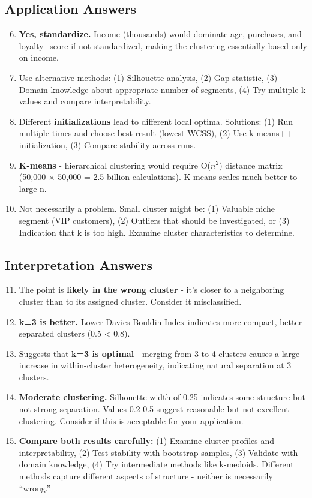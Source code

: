 \documentclass[
]{article}
\begin{document}
\textbf{ }

\subsection{Application Answers}

\begin{enumerate}
\setcounter{enumi}{5}
\item
  \textbf{Yes, standardize.} Income (thousands) would dominate age,
  purchases, and loyalty\_score if not standardized, making the
  clustering essentially based only on income.
\item
  Use alternative methods: (1) Silhouette analysis, (2) Gap statistic,
  (3) Domain knowledge about appropriate number of segments, (4) Try
  multiple k values and compare interpretability.
\item
  Different \textbf{initializations} lead to different local optima.
  Solutions: (1) Run multiple times and choose best result (lowest
  WCSS), (2) Use k-means++ initialization, (3) Compare stability across
  runs.
\item
  \textbf{K-means} - hierarchical clustering would require O(\(n^{2}\))
  distance matrix (50,000 × 50,000 = 2.5 billion calculations). K-means
  scales much better to large n.
\item
  Not necessarily a problem. Small cluster might be: (1) Valuable niche
  segment (VIP customers), (2) Outliers that should be investigated, or
  (3) Indication that k is too high. Examine cluster characteristics to
  determine.
\end{enumerate}

\textbf{ }

\subsection{Interpretation Answers}

\begin{enumerate}
\setcounter{enumi}{10}
\item
  The point is \textbf{likely in the wrong cluster} - it's closer to a
  neighboring cluster than to its assigned cluster. Consider it
  misclassified.
\item
  \textbf{k=3 is better.} Lower Davies-Bouldin Index indicates more
  compact, better-separated clusters (0.5 \textless{} 0.8).
\item
  Suggests that \textbf{k=3 is optimal} - merging from 3 to 4 clusters
  causes a large increase in within-cluster heterogeneity, indicating
  natural separation at 3 clusters.
\item
  \textbf{Moderate clustering.} Silhouette width of 0.25 indicates some
  structure but not strong separation. Values 0.2-0.5 suggest reasonable
  but not excellent clustering. Consider if this is acceptable for your
  application.
\item
  \textbf{Compare both results carefully:} (1) Examine cluster profiles
  and interpretability, (2) Test stability with bootstrap samples, (3)
  Validate with domain knowledge, (4) Try intermediate methods like
  k-medoids. Different methods capture different aspects of structure -
  neither is necessarily ``wrong.''
\end{enumerate}
\end{document}
